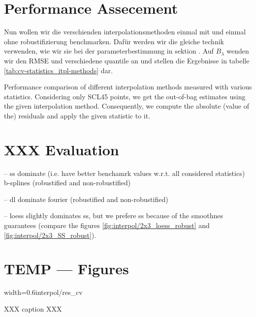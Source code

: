 \section{Performance Assecement}{
	Nun wollen wir die verschienden interpolationsmethoden einmal mit und einmal ohne robustifizierung benchmarken. Dafür werden wir die gleiche technik verwenden, wie wir sie bei der parameterbestimmung in sektion \label{sec:itpl_param_est}. Auf $B_\lambda$ wenden wir den RMSE und verschiedene quantile an und stellen die Ergebnisse in tabelle \ref{tab:cv-statistics_itpl-methods} dar. 


	\begin{table}
		\begin{center}
			\caption{Performance comparison of different interpolation methods measured with various statistics. Considering only SCL45 points, we get the out-of-bag estimates using the given interpolation method. Consequently, we compute the absolute (value of the) residuals and apply the given statistic to it.}
			\small
			
			\normalsize
			\label{tab:cv-statistics_itpl-methods}
		\end{center}
	\end{table}
}

\section{XXX Evaluation}
-- ss dominate (i.e. have better benchamrk values w.r.t. all considered statistics) b-splines (robustified and non-robustified)

-- dl dominate fourier (robustified and non-robustified)

-- loess slightly dominates ss, but we prefere ss because of the smoothnes guarantees (compare the figures \ref{fig:interpol/2x3_loess_robust} and \ref{fig:interpol/2x3_SS_robust}).

\section*{TEMP --- Figures}
\begin{my_figure}[h]{width=0.6\textwidth}{interpol/res_cv}
	\caption{XXX caption XXX}
	\label{fig:interpol/res_cv}
\end{my_figure}


